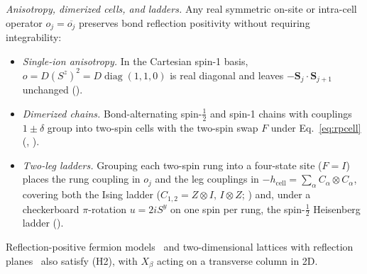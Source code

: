\documentclass[aps,prl,reprint,amsmath,amssymb,nofootinbib,raggedbottom]{revtex4-2}
\begin{document}
\emph{Anisotropy, dimerized cells, and ladders.}
Any real symmetric on-site or intra-cell operator $o_j=\overline{o_j}$
preserves bond reflection positivity without requiring integrability:
\begin{itemize}
\item \emph{Single-ion anisotropy.} In the Cartesian spin-1 basis,
$o=D(S^z)^2=D\operatorname{diag}(1,1,0)$ is real diagonal and leaves
$-\bm S_j\cdot\bm S_{j+1}$ unchanged ().
\item \emph{Dimerized chains.} Bond-alternating spin-$\tfrac12$ and spin-1
chains with couplings $1\pm\delta$ group into two-spin cells with the two-spin
swap $F$ under Eq.~\eqref{eq:rpcell} (,
).
\item \emph{Two-leg ladders.} Grouping each two-spin rung into a four-state
site ($F=I$) places the rung coupling in $o_j$ and the leg couplings in
$-h_{\mathrm{cell}}=\sum_\alpha C_\alpha\otimes C_\alpha$, covering both the
Ising ladder ($C_{1,2}=Z\otimes I,\,I\otimes Z$; )
and, under a checkerboard $\pi$-rotation $u=2iS^y$ on one spin per rung, the
spin-$\tfrac12$ Heisenberg ladder ().
\end{itemize}
Reflection-positive fermion models~\cite{jaffe} and two-dimensional lattices
with reflection planes~\cite{fils,biskup} also satisfy (H2), with $X_\beta$
acting on a transverse column in 2D.
\end{document}
